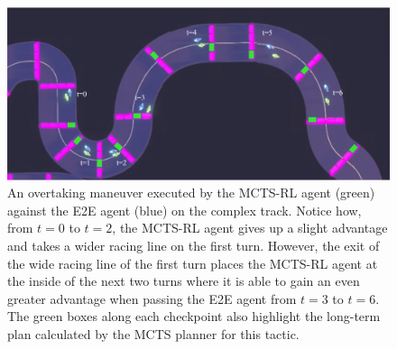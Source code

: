  \begin{figure}
  \centering
  \includegraphics[width=\textwidth]{Figures/MCTSRLOvertake.png}
  \caption [Overtaking maneuver by MCTS-RL controller.] {An overtaking maneuver executed by the MCTS-RL agent (green) against the E2E agent (blue) on the complex track. Notice how, from $t=0$ to $t=2$, the MCTS-RL agent gives up a slight advantage and takes a wider racing line on the first turn. However, the exit of the wide racing line of the first turn places the MCTS-RL agent at the inside of the next two turns where it is able to gain an even greater advantage when passing the E2E agent from $t=3$ to $t=6$. The green boxes along each checkpoint also highlight the long-term plan calculated by the MCTS planner for this tactic.}
  \label{fig:mctsrl:overtake}
\end{figure}

